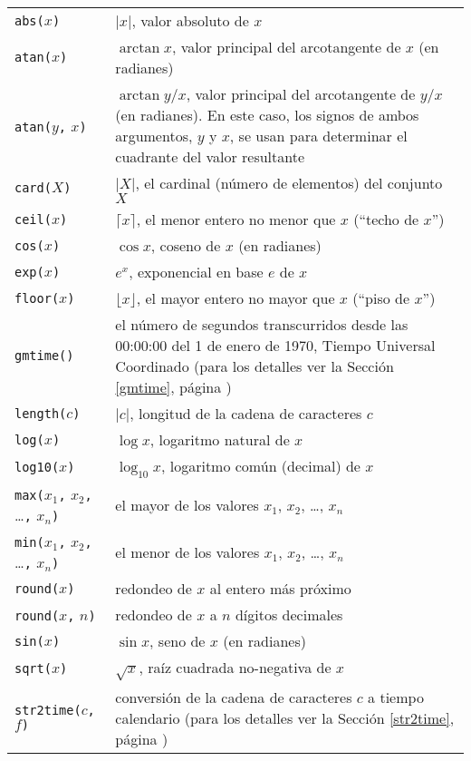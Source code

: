 \documentclass[11pt,spanish]{report}
\begin{document}
\begin{tabular}{@{}p{112pt}p{328pt}@{}}
{\tt abs(}$x${\tt)}&$|x|$, valor absoluto de $x$\\
{\tt atan(}$x${\tt)}&$\arctan x$, valor principal del arcotangente de
$x$ (en radianes)\\
{\tt atan(}$y${\tt,} $x${\tt)}&$\arctan y/x$, valor principal del arcotangente de $y/x$ (en radianes). En este caso, los signos de ambos argumentos, $y$ y $x$, se usan para determinar el cuadrante del valor resultante\\
{\tt card(}$X${\tt)}&$|X|$, el cardinal (número de elementos) del conjunto $X$\\
{\tt ceil(}$x${\tt)}&$\lceil x\rceil$, el menor entero no menor que $x$ (``techo de $x$'')\\
{\tt cos(}$x${\tt)}&$\cos x$, coseno de $x$ (en radianes)\\
{\tt exp(}$x${\tt)}&$e^x$, exponencial en base $e$ de $x$\\
{\tt floor(}$x${\tt)}&$\lfloor x\rfloor$, el mayor entero no mayor que $x$ (``piso de $x$'')\\
{\tt gmtime()}&el número de segundos transcurridos desde las 00:00:00 del 1 de enero de 1970, Tiempo Universal Coordinado (para los detalles ver la Sección \ref{gmtime}, página \pageref{gmtime})\\
{\tt length(}$c${\tt)}&$|c|$, longitud de la cadena de caracteres $c$\\
{\tt log(}$x${\tt)}&$\log x$, logaritmo natural de $x$\\
{\tt log10(}$x${\tt)}&$\log_{10}x$, logaritmo común (decimal) de $x$\\
{\tt max(}$x_1${\tt,} $x_2${\tt,} \dots{\tt,} $x_n${\tt)}&el mayor de los valores $x_1$, $x_2$, \dots, $x_n$\\
{\tt min(}$x_1${\tt,} $x_2${\tt,} \dots{\tt,} $x_n${\tt)}&el menor de los valores $x_1$, $x_2$, \dots, $x_n$\\
{\tt round(}$x${\tt)}&redondeo de $x$ al entero más próximo\\
{\tt round(}$x${\tt,} $n${\tt)}&redondeo de $x$ a $n$ dígitos decimales\\
{\tt sin(}$x${\tt)}&$\sin x$, seno de $x$ (en radianes)\\
{\tt sqrt(}$x${\tt)}&$\sqrt{x}$, raíz cuadrada no-negativa de $x$\\
{\tt str2time(}$c${\tt,} $f${\tt)}&conversión de la cadena de caracteres $c$ a tiempo calendario (para los detalles ver la Sección \ref{str2time}, página \pageref{str2time})\\

\end{tabular}
\end{document}
